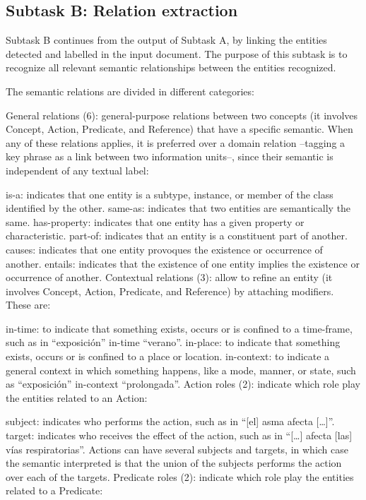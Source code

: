 \documentclass[a4paper,11pt,twocolumn,twoside]{article}
\begin{document}
\subsection{Subtask B: Relation extraction}

Subtask B continues from the output of Subtask A, by linking the entities detected and labelled in the input document. The purpose of this subtask is to recognize all relevant semantic relationships between the entities recognized.

The semantic relations are divided in different categories:

General relations (6): general-purpose relations between two concepts (it involves Concept, Action, Predicate, and Reference) that have a specific semantic. When any of these relations applies, it is preferred over a domain relation –tagging a key phrase as a link between two information units–, since their semantic is independent of any textual label:

is-a: indicates that one entity is a subtype, instance, or member of the class identified by the other.
same-as: indicates that two entities are semantically the same.
has-property: indicates that one entity has a given property or characteristic.
part-of: indicates that an entity is a constituent part of another.
causes: indicates that one entity provoques the existence or occurrence of another.
entails: indicates that the existence of one entity implies the existence or occurrence of another.
Contextual relations (3): allow to refine an entity (it involves Concept, Action, Predicate, and Reference) by attaching modifiers. These are:

in-time: to indicate that something exists, occurs or is confined to a time-frame, such as in “exposición” in-time “verano”.
in-place: to indicate that something exists, occurs or is confined to a place or location.
in-context: to indicate a general context in which something happens, like a mode, manner, or state, such as “exposición” in-context “prolongada”.
Action roles (2): indicate which role play the entities related to an Action:

subject: indicates who performs the action, such as in “[el] asma afecta […]”.
target: indicates who receives the effect of the action, such as in “[…] afecta [las] vías respiratorias”. Actions can have several subjects and targets, in which case the semantic interpreted is that the union of the subjects performs the action over each of the targets.
Predicate roles (2): indicate which role play the entities related to a Predicate:
\end{document}
